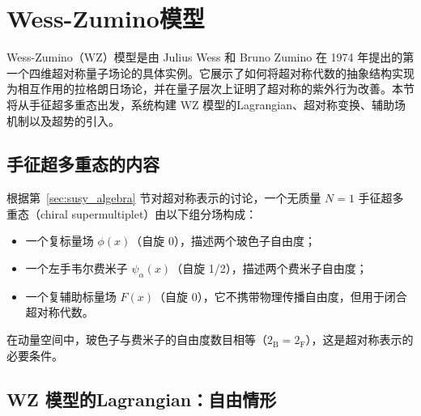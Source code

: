 

\section{Wess-Zumino模型}
Wess-Zumino（WZ）模型是由 Julius Wess 和 Bruno Zumino 在 1974 年提出的第一个四维超对称量子场论的具体实例。它展示了如何将超对称代数的抽象结构实现为相互作用的拉格朗日场论，并在量子层次上证明了超对称的紫外行为改善。本节将从手征超多重态出发，系统构建 WZ 模型的Lagrangian、超对称变换、辅助场机制以及超势的引入。

\subsection*{手征超多重态的内容}

根据第~\ref{sec:susy_algebra} 节对超对称表示的讨论，一个无质量 $N=1$ 手征超多重态（chiral supermultiplet）由以下组分场构成：
\begin{itemize}
\item 一个复标量场 $\phi(x)$（自旋 0），描述两个玻色子自由度；
\item 一个左手韦尔费米子 $\psi_\alpha(x)$（自旋 1/2），描述两个费米子自由度；
\item 一个复辅助标量场 $F(x)$（自旋 0），它不携带物理传播自由度，但用于闭合超对称代数。
\end{itemize}
在动量空间中，玻色子与费米子的自由度数目相等（$2_{\text{B}} = 2_{\text{F}}$），这是超对称表示的必要条件。

\subsection*{WZ 模型的Lagrangian：自由情形}

